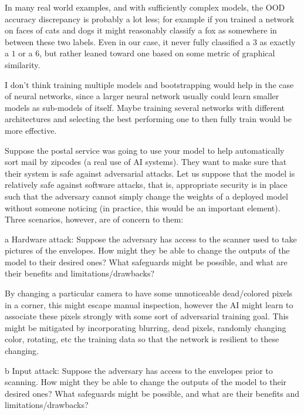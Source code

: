 \documentclass[expanded]{lkx_pset}
\begin{document}
\begin{parts}
	In many real world examples, and with sufficiently complex models, the OOD accuracy discrepancy is probably a lot less; for example if you trained a network on faces of cats and dogs it might reasonably classify a fox as somewhere in between these two labels. Even in our case, it never fully classified a $3$ as exactly a $1$ or a $6$, but rather leaned toward one based on some metric of graphical similarity.

	I don't think training multiple models and bootstrapping would help in the case of neural networks, since a larger neural network usually could learn smaller models as sub-models of itself. Maybe training several networks with different architectures and selecting the best performing one to then fully train would be more effective.

	\begin{part}{5}
		Suppose the postal service was going to use your model to help automatically sort mail by zipcodes (a real use of AI systems).  They want to make sure that their system is safe against adversarial attacks.  Let us suppose that the model is relatively safe against software attacks, that is, appropriate security is in place such that the adversary cannot simply change the weights of a deployed model without someone noticing (in practice, this would be an important element).  Three scenarios, however, are of concern to them:
	\end{part}

	\begin{parts}
		\begin{part}{a}
			Hardware attack: Suppose the adversary has access to the
			scanner used to take pictures of the envelopes.  How might
			they be able to change the outputs of the model to their
			desired ones?  What safeguards might be possible, and what
			are their benefits and limitations/drawbacks?
		\end{part}

		By changing a particular camera to have some unnoticeable dead/colored pixels in a corner, this might escape manual inspection, however the AI might learn to associate these pixels strongly with some sort of adversarial training goal. This might be mitigated by incorporating blurring, dead pixels, randomly changing color, rotating, etc the training data so that the network is resilient to these changing.

		\begin{part}{b}
			Input attack: Suppose the adversary has access to the
			envelopes prior to scanning.  How might they be able to
			change the outputs of the model to their desired ones?
			What safeguards might be possible, and what are their
			benefits and limitations/drawbacks?
		\end{part}


\end{parts}
\end{parts}
\end{document}
